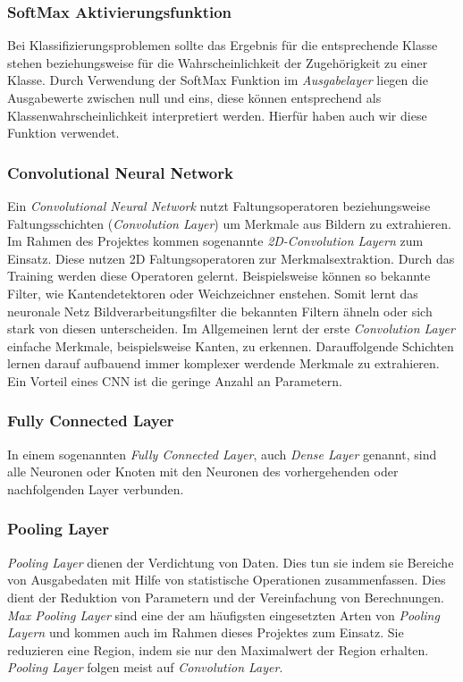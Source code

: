 \documentclass[11pt]{article}
\begin{document}
\subsubsection*{SoftMax Aktivierungsfunktion}
Bei Klassifizierungsproblemen sollte das Ergebnis für die entsprechende Klasse stehen beziehungsweise für die Wahrscheinlichkeit der Zugehörigkeit zu einer Klasse. Durch Verwendung der SoftMax Funktion im \textit{Ausgabelayer} liegen die Ausgabewerte zwischen null und eins, diese können entsprechend als Klassenwahrscheinlichkeit interpretiert werden. Hierfür haben auch wir diese Funktion verwendet. \parencite{AndreasLindholmNiklasWahlstromFredrikLindsten2019}

\subsubsection{Convolutional Neural Network}
Ein \textit{Convolutional Neural Network} nutzt Faltungsoperatoren beziehungsweise Faltungsschichten (\textit{Convolution Layer}) um Merkmale aus Bildern zu extrahieren. Im Rahmen des Projektes kommen sogenannte \textit{2D-Convolution Layern} zum Einsatz. Diese nutzen 2D Faltungsoperatoren zur Merkmalsextraktion. Durch das Training werden diese Operatoren gelernt. Beispielsweise können so bekannte Filter, wie Kantendetektoren oder Weichzeichner enstehen. Somit lernt das neuronale Netz Bildverarbeitungsfilter die bekannten Filtern ähneln oder sich stark von diesen unterscheiden. Im Allgemeinen lernt der erste \textit{Convolution Layer} einfache Merkmale, beispielsweise Kanten, zu erkennen. Darauffolgende Schichten lernen darauf aufbauend immer komplexer werdende Merkmale zu extrahieren. Ein Vorteil eines CNN ist die geringe Anzahl an Parametern.\parencite{Pattanayak2017}

\subsubsection*{Fully Connected Layer}
In einem sogenannten \textit{Fully Connected Layer}, auch \textit{Dense Layer} genannt, sind alle Neuronen oder Knoten mit den Neuronen des vorhergehenden oder nachfolgenden Layer verbunden.\parencite{Pattanayak2017}

\subsubsection*{Pooling Layer}
\textit{Pooling Layer} dienen der Verdichtung von Daten. Dies tun sie indem sie Bereiche von Ausgabedaten mit Hilfe von statistische Operationen zusammenfassen. Dies dient der Reduktion von Parametern und der Vereinfachung von Berechnungen.  \textit{Max Pooling Layer} sind eine der am häufigsten eingesetzten Arten von \textit{Pooling Layern} und kommen auch im Rahmen dieses Projektes zum Einsatz. Sie reduzieren eine Region, indem sie nur den Maximalwert der Region erhalten. \textit{Pooling Layer} folgen meist auf \textit{Convolution Layer}.\parencite{Karpathy}\parencite{IanGoodfellowYoshuaBengio2016}
\end{document}
